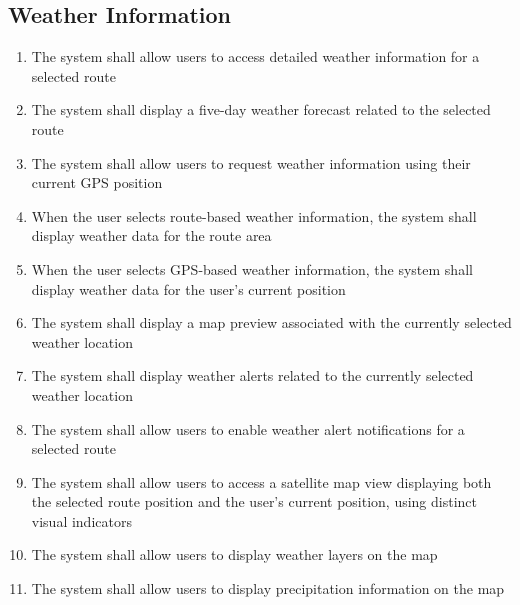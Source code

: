 \subsection{Weather Information}

\begin{enumerate}[label=\textbf{FR\arabic*}, ref=FR\arabic*, resume]

\item \label{fr-smartphone:fr63}
The system shall allow users to access detailed weather information for a selected route

\item \label{fr-smartphone:fr64}
The system shall display a five-day weather forecast related to the selected route

\item \label{fr-smartphone:fr65}
The system shall allow users to request weather information using their current GPS position

\item \label{fr-smartphone:fr66}
When the user selects route-based weather information, the system shall display weather data for the route area

\item \label{fr-smartphone:fr67}
When the user selects GPS-based weather information, the system shall display weather data for the user’s current position

\item \label{fr-smartphone:fr68}
The system shall display a map preview associated with the currently selected weather location

\item \label{fr-smartphone:fr69}
The system shall display weather alerts related to the currently selected weather location

\item \label{fr-smartphone:fr70}
The system shall allow users to enable weather alert notifications for a selected route

\item \label{fr-smartphone:fr71}
The system shall allow users to access a satellite map view displaying both the selected route position and the user’s current position, using distinct visual indicators

\item \label{fr-smartphone:fr72}
The system shall allow users to display weather layers on the map

\item \label{fr-smartphone:fr73}
The system shall allow users to display precipitation information on the map


\end{enumerate}
